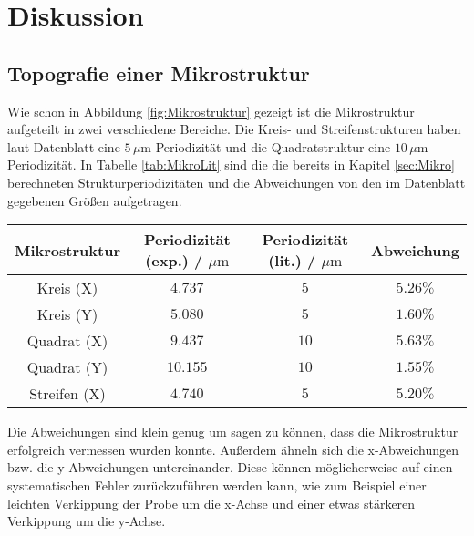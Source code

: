 \section{Diskussion}    
    \subsection{Topografie einer Mikrostruktur}
        Wie schon in Abbildung \ref{fig:Mikrostruktur} gezeigt ist die Mikrostruktur aufgeteilt in zwei verschiedene Bereiche. Die Kreis- und Streifenstrukturen haben laut Datenblatt eine $5\,\mu\text{m}$-Periodizität und die Quadratstruktur eine $10\,\mu\text{m}$-Periodizität. In Tabelle \ref{tab:MikroLit} sind die die bereits in Kapitel \ref{sec:Mikro} berechneten Strukturperiodizitäten und die Abweichungen von den im Datenblatt gegebenen Größen aufgetragen.
        \begin{center}
            \label{tab:MikroLit}
            \begin{tabular}{c c c c}
                \toprule
                Mikrostruktur & Periodizität (exp.) / $\mu\text{m}$ & Periodizität (lit.) / $\mu\text{m}$ & Abweichung\\
                \midrule
                Kreis (X)   & $4.737$  & $5$ & $5.26\%$ \\
                Kreis (Y)   & $5.080$  & $5$ & $1.60\%$ \\
                Quadrat (X) & $9.437$  & $10$& $5.63\%$ \\
                Quadrat (Y) & $10.155$ & $10$& $1.55\%$ \\
                Streifen (X)& $4.740$  & $5$ & $5.20\%$ \\
                \bottomrule
            \end{tabular}
        \end{center}
        Die Abweichungen sind klein genug um sagen zu können, dass die Mikrostruktur erfolgreich vermessen wurden konnte. Außerdem ähneln sich die x-Abweichungen bzw. die y-Abweichungen untereinander. Diese können möglicherweise auf einen systematischen Fehler zurückzuführen werden kann, wie zum Beispiel einer leichten Verkippung der Probe um die x-Achse und einer etwas stärkeren Verkippung um die y-Achse.
        \FloatBarrier
